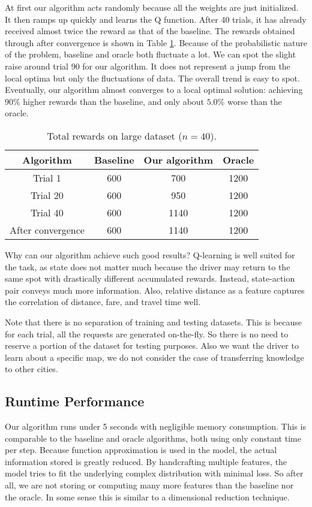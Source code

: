 \documentclass{article}
\begin{document}
At first our algorithm acts randomly because all the weights are just initialized. It then ramps up quickly and learns the Q function. After 40 trials, it has already received almost twice the reward as that of the baseline. The rewards obtained through after convergence is shown in Table \ref{tbl:reward}. Because of the probabilistic nature of the problem, baseline and oracle both fluctuate a lot. We can spot the slight raise around trial 90 for our algorithm. It does not represent a jump from the local optima but only the fluctuations of data. The overall trend is easy to spot. Eventually, our algorithm almost converges to a local optimal solution: achieving $90\%$ higher rewards than the baseline, and only about $5.0\%$ worse than the oracle.

\begin{table}[!htb]
\caption{Total rewards on large dataset ($n=40$).}
\label{tbl:reward}
\centering
\begin{tabular}{c|ccc}
\hline
Algorithm & Baseline & Our algorithm & Oracle \\\hline
Trial 1 & 600 & 700 & 1200 \\
Trial 20 & 600 & 950 & 1200 \\
Trial 40 & 600 & 1140 & 1200 \\
After convergence & 600 & 1140 & 1200
\end{tabular}
\end{table}

Why can our algorithm achieve such good results? Q-learning is well suited for the task, as state does not matter much because the driver may return to the same spot with drastically different accumulated rewards. Instead, state-action pair conveys much more information. Also, relative distance as a feature captures the correlation of distance, fare, and travel time well.

Note that there is no separation of training and testing datasets. This is because for each trial, all the requests are generated on-the-fly. So there is no need to reserve a portion of the dataset for testing purposes. Also we want the driver to learn about a specific map, we do not consider the case of transferring knowledge to other cities.

\subsection{Runtime Performance}

Our algorithm runs under 5 seconds with negligible memory consumption. This is comparable to the baseline and oracle algorithms, both using only constant time per step. Because function approximation is used in the model, the actual information stored is greatly reduced. By handcrafting multiple features, the model tries to fit the underlying complex distribution with minimal loss. So after all, we are not storing or computing many more features than the baseline nor the oracle. In some sense this is similar to a dimensional reduction technique.
\end{document}
